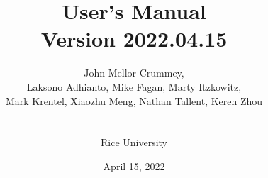 \documentclass[11pt,twoside,letterpaper]{report}
\begin{document}

\title{\HPCToolkit{} User's Manual\\[.5in]Version 2022.04.15}

\author{John Mellor-Crummey,\\
Laksono Adhianto,
Mike Fagan,
Marty Itzkowitz,\\
Mark Krentel,
Xiaozhu Meng,
Nathan Tallent,
Keren Zhou\\
\\
\\
Rice University\\
}

\date{April 15, 2022}

\maketitle



\setcounter{page}{1}






\
\begin{singlespace}


\pagestyle{empty}
\thispagestyle{empty}
\tableofcontents



\end{singlespace}
\end{document}
